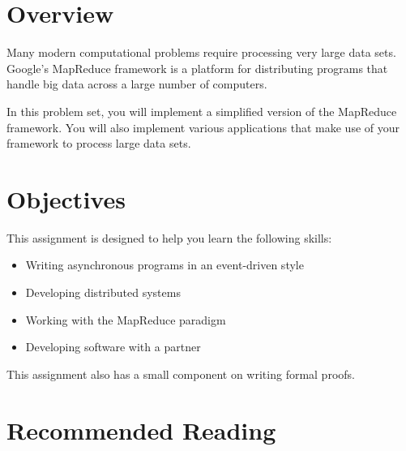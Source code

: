 \documentclass{pset}
\date{Due Thursday, April 17}
\begin{document}
\maketitle{}

\section*{Overview}

Many modern computational problems require processing very large data sets.
Google's MapReduce framework is a platform for distributing programs that
handle big data across a large number of computers.

In this problem set, you will implement a simplified version of the MapReduce
framework.  You will also implement various applications that make use of your
framework to process large data sets.

\section*{Objectives}

This assignment is designed to help you learn the following skills:
\begin{itemize}
\item Writing asynchronous programs in an event-driven style
\item Developing distributed systems
\item Working with the MapReduce paradigm
\item Developing software with a partner
\end{itemize}

This assignment also has a small component on writing formal proofs.

\section*{Recommended Reading}
\end{document}
